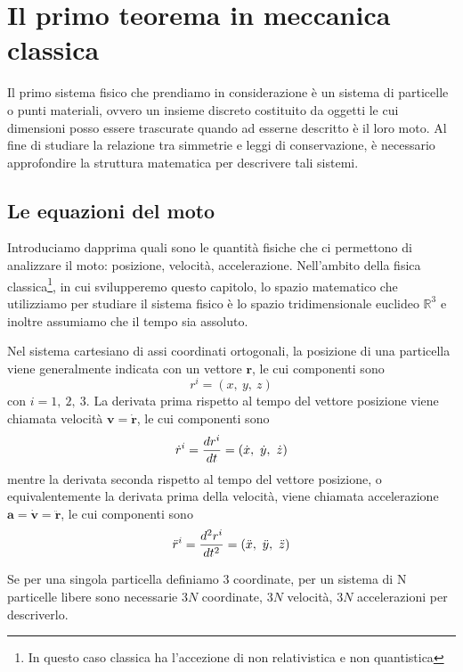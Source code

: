 \chapter{Il primo teorema in meccanica classica}
    
    Il primo sistema fisico che prendiamo in considerazione è un sistema di particelle o punti materiali, ovvero un insieme discreto costituito da oggetti le cui dimensioni posso essere trascurate quando ad esserne descritto è il loro moto. Al fine di studiare la relazione tra simmetrie e leggi di conservazione, è necessario approfondire la struttura matematica per descrivere tali sistemi. 

\section{Le equazioni del moto}
    
    Introduciamo dapprima quali sono le quantità fisiche che ci permettono di analizzare il moto: posizione, velocità, accelerazione. Nell'ambito della fisica classica\footnote{In questo caso classica ha l'accezione di non relativistica e non quantistica}, in cui svilupperemo questo capitolo, lo spazio matematico che utilizziamo per studiare il sistema fisico è lo spazio tridimensionale euclideo $\mathbb R^3$ e inoltre assumiamo che il tempo sia assoluto.
    
    Nel sistema cartesiano di assi coordinati ortogonali, la posizione di una particella viene generalmente indicata con un vettore $\mathbf r$, le cui componenti sono 
    \begin{equation*}
        r^i = (x, ~y, ~z)
    \end{equation*}
    con $i = 1, ~2, ~3$. La derivata prima rispetto al tempo del vettore posizione viene chiamata velocità $\mathbf v = \mathbf {\dot r}$, le cui componenti sono 
    \begin{equation*}
        \dot r^i = \frac{dr^i}{dt} = (\dot x, ~\dot y, ~\dot z)
    \end{equation*}
    mentre la derivata seconda rispetto al tempo del vettore posizione, o equivalentemente la derivata prima della velocità, viene chiamata accelerazione $\mathbf a = \mathbf{\dot v} = \mathbf{\ddot r}$, le cui componenti sono 
    \begin{equation*}
        \ddot r^i = \frac{d^2r^i}{dt^2} = (\ddot x, ~\ddot y, ~\ddot z)
    \end{equation*}
    
    Se per una singola particella definiamo $3$ coordinate, per un sistema di N particelle libere sono necessarie $3N$ coordinate, $3N$ velocità, $3N$ accelerazioni per descriverlo. 
    

